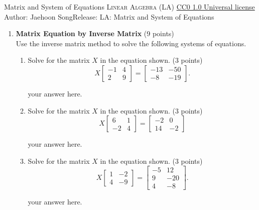 \handout
{Matrix and System of Equations}
{\textsc{Linear Algebra (LA)}}
{\href{https://creativecommons.org/publicdomain/zero/1.0/}{CC0 1.0 Universal license}}
{Author: Jaehoon Song}{Release: \generatedOn}
{LA: Matrix and System of Equations}



\begin{enumerate}
  \item \textbf{Matrix Equation by Inverse Matrix} (9 points)\\
  Use the inverse matrix method to solve the following systems of equations.
  \begin{enumerate}
    \item Solve for the matrix \(X\) in the equation shown. (3 points)
    \[
    X\begin{bmatrix}
    -1 & 4 \\
    2 & 9
    \end{bmatrix} =
    \begin{bmatrix}
    -13 & -50 \\
    -8 & -19
    \end{bmatrix}.
    \]
    \begin{subanswer}
      your answer here.
    \end{subanswer}

    \item Solve for the matrix \(X\) in the equation shown. (3 points)
    \[
    X \begin{bmatrix} 6 & 1 \\ -2 & 4 \end{bmatrix} = \begin{bmatrix} -2 & 0 \\ 14 & -2 \end{bmatrix}
    \]
    \begin{subanswer}
      your answer here.
    \end{subanswer}

    \item Solve for the matrix \(X\) in the equation shown. (3 points)
    \[
    X\begin{bmatrix}
    1 & -2 \\
    4 & -9
    \end{bmatrix} =
    \begin{bmatrix}
    -5 & 12 \\
    9 & -20 \\
    4 & -8
    \end{bmatrix}.
    \]
    \begin{subanswer}
      your answer here.
    \end{subanswer}
  \end{enumerate}


\end{enumerate}
